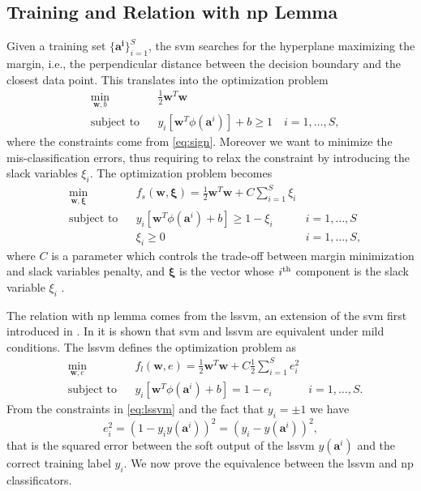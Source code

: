 \documentclass[draftcls,onecolumn,12pt]{IEEEtran}
\newcommand{\ie}{i.e., }
\begin{document}
\subsection{Training and Relation with \ac{np} Lemma}
Given a training set $\{\mathbf{a^i}\}_{i=1}^S$, the \ac{svm} searches for the hyperplane maximizing the margin, \ie the perpendicular distance between the decision boundary and the closest data point. This translates into the optimization problem \cite{Bishop2006}
\begin{equation}
\label{eq:svmS}
\begin{aligned}
& \underset{\mathbf{w},b}{\text{min}} & & \frac{1}{2} \mathbf{w}^T \mathbf{w} \\
& \text{subject to} & & y_i[\mathbf{w}^T \phi (\mathbf{a}^i)] + b \geq 1 \quad i = 1,\dots,S,
\end{aligned}
\end{equation}
where the constraints come from \eqref{eq:sign}. Moreover we want to minimize the mis-classification errors, thus requiring to relax the constraint by introducing the slack variables $\xi_i$. The optimization problem becomes
\begin{equation}
	\begin{aligned}
	& \underset{\mathbf{w},\bm{\xi}}{\text{min}} & & f_s(\mathbf{w},\bm{\xi})= \frac{1}{2} \mathbf{w}^T \mathbf{w} + C \sum_{i=1}^S \xi_i & \\
	& \text{subject to} & & y_i[\mathbf{w}^T \phi (\mathbf{a}^i) + b] \geq 1- \xi_i & i = 1 ,\dots,S \\
	&					& & \xi_i \geq 0 & i = 1 ,\dots,S,
	\end{aligned}	
\end{equation} 
where $C$ is a parameter which controls the trade-off between margin minimization and slack variables penalty, and $\bm{\xi}$ is the vector whose $i^{\rm th}$ component is the slack variable $\xi_i$ . 

The relation with \ac{np} lemma comes from the \ac{lssvm}, an extension of the \ac{svm} first introduced in \cite{Suykens1999}. In \cite{Yevs} it is shown that  \ac{svm} and \ac{lssvm} are equivalent under mild conditions. The \ac{lssvm} defines the optimization problem as
\begin{equation}
\label{eq:lssvm}
	\begin{aligned}
	& \underset{\mathbf{w},e}{\text{min}} & & f_l(\mathbf{w},e) = \frac{1}{2} \mathbf{w}^T \mathbf{w} + C \frac{1}{2} \sum_{i=1}^S e_i ^2 & \\
	& \text{subject to} & & y_i[\mathbf{w}^T \phi (\mathbf{a}^i) + b] = 1- e_i & i = 1 ,\dots,S.
	\end{aligned}	
\end{equation}
From the constraints in \eqref{eq:lssvm} and the fact that $y_i = \pm 1$ we have
\begin{equation}
\label{eq:els}
		e_i^2 = (1 - y_iy(\mathbf{a}^i) )^2 = (y_i - y(\mathbf{a}^i))^2,
\end{equation}
that is the squared error between the soft output of the \ac{lssvm} $y(\mathbf{a}^i)$ and the correct training label $y_i$. We now prove the equivalence between the \ac{lssvm} and \ac{np} classificators. 
\end{document}
